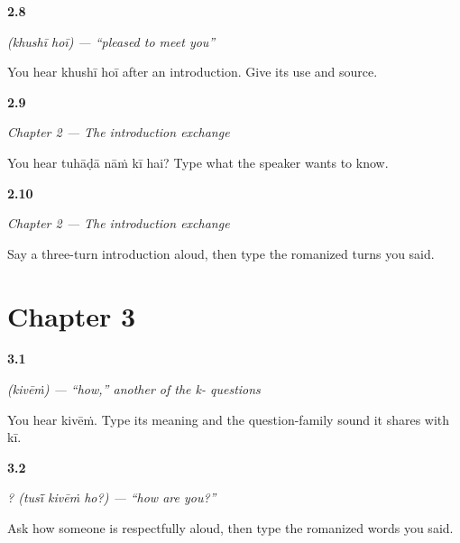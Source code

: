 \noindent\begin{minipage}[t]{\linewidth}
\raggedright
\hypertarget{review-PA-C02-khushi-meaning}{\textbf{2.8}} \emph{  (khushī hoī) — \textquotedblleft{}pleased to meet you\textquotedblright{}}\par
\small You hear khushī hoī after an introduction. Give its use and source.
\end{minipage}\par\medskip

\noindent\begin{minipage}[t]{\linewidth}
\raggedright
\hypertarget{review-PA-C02-practice-listening}{\textbf{2.9}} \emph{Chapter 2 — The introduction exchange}\par
\small You hear tuhāḍā nāṁ kī hai? Type what the speaker wants to know.
\end{minipage}\par\medskip

\noindent\begin{minipage}[t]{\linewidth}
\raggedright
\hypertarget{review-PA-C02-practice-speaking}{\textbf{2.10}} \emph{Chapter 2 — The introduction exchange}\par
\small Say a three-turn introduction aloud, then type the romanized turns you said.
\end{minipage}\par\medskip

\section*{Chapter 3}

\noindent\begin{minipage}[t]{\linewidth}
\raggedright
\hypertarget{review-PA-C03-kivein-meaning}{\textbf{3.1}} \emph{ (kivēṁ) — \textquotedblleft{}how,\textquotedblright{} another of the k- questions}\par
\small You hear kivēṁ. Type its meaning and the question-family sound it shares with kī.
\end{minipage}\par\medskip

\noindent\begin{minipage}[t]{\linewidth}
\raggedright
\hypertarget{review-PA-C03-tusi-kivein-ho-speaking}{\textbf{3.2}} \emph{  ? (tusī̃ kivēṁ ho?) — \textquotedblleft{}how are you?\textquotedblright{}}\par
\small Ask how someone is respectfully aloud, then type the romanized words you said.
\end{minipage}\par\medskip

